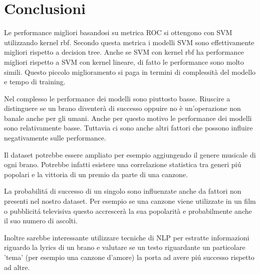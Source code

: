 \chapter{Conclusioni}
Le performance migliori basandosi su metrica ROC si ottengono con SVM utilizzando kernel rbf. Secondo questa metrica i modelli SVM sono effettivamente migliori rispetto a decision tree. Anche se SVM con kernel rbf ha performance migliori rispetto a SVM con kernel lineare, di fatto le performance sono molto simili. Questo piccolo miglioramento si paga in termini di complessità del modello e tempo di training.

Nel complesso le performance dei modelli sono piuttosto basse. Riuscire a distinguere se un brano diventerà di successo oppuire no è un'operazione non banale anche per gli umani. Anche per questo motivo le performance dei modelli sono relativamente basse. Tuttavia ci sono anche altri fattori che possono influire negativamente sulle performance.

Il dataset potrebbe essere ampliato per esempio aggiungendo il genere
musicale di ogni brano. Potrebbe infatti esistere una correlazione 
statistica tra generi piú popolari e la vittoria di un premio da parte di una canzone.


La probabilitá di successo di un singolo sono influenzate anche da fattori non presenti nel nostro dataset. Per esempio se una
canzone viene utilizzate in un film o pubblicitá televisiva questo
accrescerà la sua popolarità e probabilmente anche il suo numero di
ascolti.

Inoltre sarebbe interessante utilizzare  tecniche di NLP per estratte informazioni riguardo la lyrics di un brano 
e valutare se un testo riguardante un particolare 'tema' (per esempio una canzone d'amore) la porta ad avere
piú successo rispetto ad altre.

